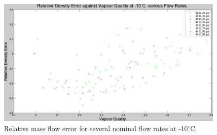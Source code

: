 \documentclass{report}
\begin{document}

\begin{figure}
\includegraphics[width=\textwidth]{plots/fig4}
\caption{Relative mass flow error for several nominal flow rates at -10$^\circ$C.}
\label{plot:4}
\end{figure}
\end{document}
